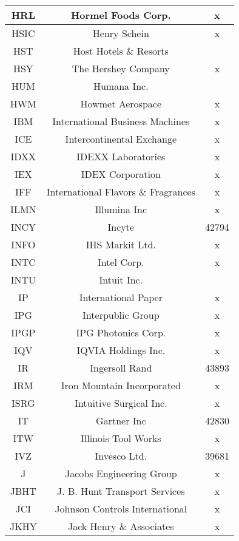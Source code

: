 \documentclass[11pt]{article}
\begin{document}
\begin{onehalfspace}
\begin{longtable}[h!]{|c|c|c|}
        HRL & Hormel Foods Corp. & x \\ \hline
        HSIC & Henry Schein & x \\ \hline
        HST & Host Hotels \& Resorts &  \\ \hline
        HSY & The Hershey Company & x \\ \hline
        HUM & Humana Inc. &  \\ \hline
        HWM & Howmet Aerospace & x \\ \hline
        IBM & International Business Machines & x \\ \hline
        ICE & Intercontinental Exchange & x \\ \hline
        IDXX & IDEXX Laboratories & x \\ \hline
        IEX & IDEX Corporation & x \\ \hline
        IFF & International Flavors \& Fragrances & x \\ \hline
        ILMN & Illumina Inc & x \\ \hline
        INCY & Incyte & 42794 \\ \hline
        INFO & IHS Markit Ltd. & x \\ \hline
        INTC & Intel Corp. & x \\ \hline
        INTU & Intuit Inc. &  \\ \hline
        IP & International Paper & x \\ \hline
        IPG & Interpublic Group & x \\ \hline
        IPGP & IPG Photonics Corp. & x \\ \hline
        IQV & IQVIA Holdings Inc. & x \\ \hline
        IR & Ingersoll Rand & 43893 \\ \hline
        IRM & Iron Mountain Incorporated & x \\ \hline
        ISRG & Intuitive Surgical Inc. & x \\ \hline
        IT & Gartner Inc & 42830 \\ \hline
        ITW & Illinois Tool Works & x \\ \hline
        IVZ & Invesco Ltd. & 39681 \\ \hline
        J & Jacobs Engineering Group & x \\ \hline
        JBHT & J. B. Hunt Transport Services & x \\ \hline
        JCI & Johnson Controls International & x \\ \hline
        JKHY & Jack Henry \& Associates & x \\ \hline

\end{longtable}
\end{onehalfspace}
\end{document}
